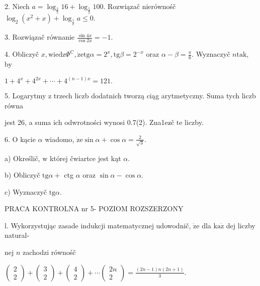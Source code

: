 \documentclass[a4paper,12pt]{article}
\begin{document}
2. Niech $a=\log_{\frac{2}{5}}16+\log_{\frac{5}{2}}100$. Rozwiązač nierównośč $\log_{2}(x^{2}+x)+\log_{\frac{1}{2}}a\leq 0.$

3. Rozwiązač równanie $\displaystyle \frac{\sin 4x}{\cos 2x}=-1.$

4. Obliczyč $x, \mathrm{w}\mathrm{i}\mathrm{e}\mathrm{d}\mathrm{z}\Phi^{\mathrm{C}}, \dot{\mathrm{z}}\mathrm{e}\mathrm{t}\mathrm{g}\alpha = 2^{x}, \mathrm{t}\mathrm{g}\beta= 2^{-x}$ oraz $\alpha-\beta= \displaystyle \frac{\pi}{6}$. Wyznaczyč $n\mathrm{t}\mathrm{a}\mathrm{k}$, by

$1+4^{x}+4^{2x}+\cdots+4^{(n-1)x}=121.$

5. Logarytmy $\mathrm{z}$ trzech liczb dodatnich tworzą ciąg arytmetyczny. Suma tych liczb równa

jest 26, a suma ich odwrotności wynosi 0.7(2). Zna1ez$\acute{}$č $\mathrm{t}\mathrm{e}$ liczby.

6. $\mathrm{O}$ kącie $\alpha$ wiadomo, $\displaystyle \dot{\mathrm{z}}\mathrm{e}\sin\alpha+\cos\alpha=\frac{2}{\sqrt{3}}.$

a) Określič, $\mathrm{w}$ której čwiartce jest kąt $\alpha.$

b) Obliczyč $\mathrm{t}\mathrm{g}\alpha+$ ctg $\alpha$ oraz $\sin\alpha-\cos\alpha.$

c) Wyznaczyč $\mathrm{t}\mathrm{g}\alpha.$





PRACA KONTROLNA nr 5- POZIOM ROZSZERZONY

l. Wykorzystując zasade indukcji matematycznej udowodnič, $\dot{\mathrm{z}}\mathrm{e}$ dla $\mathrm{k}\mathrm{a}\dot{\mathrm{z}}$ dej liczby natural-

nej $n$ zachodzi równośč

$\left(\begin{array}{l}
2\\
2
\end{array}\right) + \left(\begin{array}{l}
3\\
2
\end{array}\right) + \left(\begin{array}{l}
4\\
2
\end{array}\right) +\cdots\left(\begin{array}{l}
2n\\
2
\end{array}\right) =\displaystyle \frac{(2n-1)n(2n+1)}{3}.$
\end{document}
